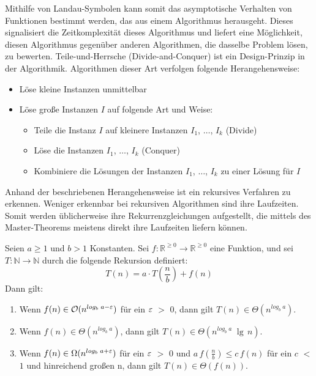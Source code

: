 Mithilfe von Landau-Symbolen kann somit das asymptotische Verhalten von Funktionen bestimmt werden, das aus einem Algorithmus herausgeht.
Dieses signalisiert die Zeitkomplexität dieses Algorithmus und liefert eine Möglichkeit, diesen Algorithmus gegenüber anderen Algorithmen, die dasselbe Problem lösen, zu bewerten.
\newpage
Teile-und-Herrsche (Divide-and-Conquer) ist ein Design-Prinzip in der Algorithmik.
Algorithmen dieser Art verfolgen folgende Herangehensweise:
\begin{itemize}
    \item Löse kleine Instanzen unmittelbar
    \item Löse große Instanzen $I$ auf folgende Art und Weise:
    \begin{itemize}
        \item Teile die Instanz $I$ auf kleinere Instanzen $I_{1}$, $\dots$, $I_{k}$ (Divide)
        \item Löse die Instanzen $I_{1}$, $\dots$, $I_{k}$ (Conquer)
        \item Kombiniere die Lösungen der Instanzen $I_{1}$, $\dots$, $I_{k}$ zu einer Lösung für $I$
    \end{itemize}
\end{itemize}
Anhand der beschriebenen Herangehensweise ist ein rekursives Verfahren zu erkennen.
Weniger erkennbar bei rekursiven Algorithmen sind ihre Laufzeiten.
Somit werden üblicherweise ihre Rekurrenzgleichungen aufgestellt, die mittels des Master-Theorems meistens direkt ihre Laufzeiten liefern können.
\begin{theorem}
    Seien $a \geq 1$ und $b > 1$ Konstanten.
    Sei $ f: \mathbb{R}^{\geq 0} \rightarrow \mathbb{R}^{\geq 0}$ eine Funktion, und sei $T : \mathbb{N} \rightarrow \mathbb{N}$ durch die folgende Rekursion definiert:
    \[
        T(n) = a \cdot T \left(\frac{n}{b}\right) + f(n)
    \]
    Dann gilt:
    \begin{enumerate}
        \item Wenn $f(n) \in \mathcal{O}(n^{log_b\;a-\varepsilon}) $ für ein $\varepsilon$ $>$ $0$, dann gilt $T(n) \in \Theta(n^{log_b\;a})$.
        \item Wenn $f(n) \in \Theta(n^{log_b\;a})$, dann gilt $T(n) \in \Theta(n^{log_b\;a}\;\lg\,n)$.
        \item Wenn $f(n) \in \Omega(n^{log_b\;a+\varepsilon}) $ für ein $\varepsilon$ $>$ $0$ und $a\,f\left(\frac{n}{b}\right) \leq c\,f(n)$ für ein $c$ $<$ $1$ und hinreichend großen n, dann gilt $T(n) \in \Theta(f(n))$.
    \end{enumerate}
\end{theorem}

